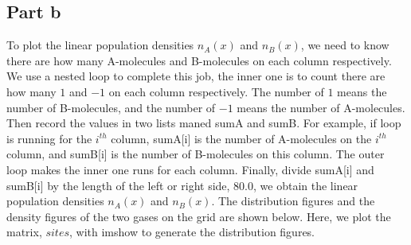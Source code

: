 \documentclass{article}
\begin{document}
\subsection{Part b}
\quad To plot the linear population densities $n_{A}(x)$ and $n_{B}(x)$, we need
to know there are how many A-molecules and B-molecules on each column
respectively. We use a nested loop to complete this job, the inner one is to
count there are how many $1$ and $-1$ on each column respectively. The
number of $1$ means the number of B-molecules, and the number of $-1$ means
the number of A-molecules. Then record the values in two lists maned sumA
and sumB. For example, if loop is running for the $i^{th}$ column, sumA[i]
is the number of A-molecules on the $i^{th}$ column, and sumB[i] is the
number of B-molecules on this column. The outer loop makes the inner one
runs for each column. Finally, divide sumA[i] and sumB[i] by the length of
the left or right side, $80.0$, we obtain the linear population densities $%
n_{A}(x)$ and $n_{B}(x)$. The distribution figures and the density figures
of the two gases on the grid are shown below. Here, we plot the matrix, $%
sites$, with imshow to generate the distribution figures.
\begin{figure}[!ht]
	\centering
\end{figure}
\begin{figure}[!ht]
	\centering
\end{figure}
\end{document}
